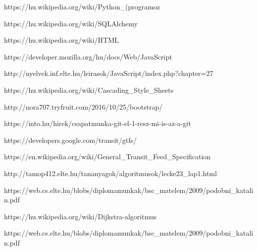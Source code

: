 \begin{thebibliography}{x}

 https://hu.wikipedia.org/wiki/Python\_(programoz%


 https://hu.wikipedia.org/wiki/SQLAlchemy

 https://hu.wikipedia.org/wiki/HTML

 https://developer.mozilla.org/hu/docs/Web/JavaScript

 http://nyelvek.inf.elte.hu/leirasok/JavaScript/index.php?chapter=27

 https://hu.wikipedia.org/wiki/Cascading\_Style\_Sheets

 http://nora707.tryfruit.com/2016/10/25/bootstrap/

 https://into.hu/hirek/csapatmunka-git-el-1-resz-mi-is-az-a-git


https://developers.google.com/transit/gtfs/

https://en.wikipedia.org/wiki/General\_Transit\_Feed\_Specification

http://tamop412.elte.hu/tananyagok/algoritmusok/lecke23\_lap1.html

https://web.cs.elte.hu/blobs/diplomamunkak/bsc\_matelem/2009/podobni\_katalin.pdf

https://hu.wikipedia.org/wiki/Dijkstra-algoritmus

https://web.cs.elte.hu/blobs/diplomamunkak/bsc\_matelem/2009/podobni\_katalin.pdf

\end{thebibliography}
